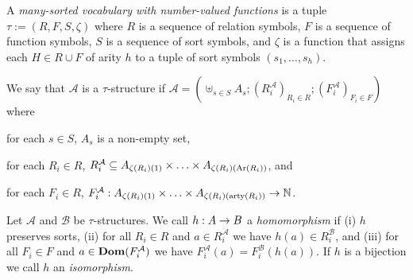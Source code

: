 \documentclass[../main/thesis.tex]{subfiles}
\begin{document}

\begin{definition}
  A \emph{many-sorted vocabulary with number-valued functions} is a tuple $\tau
  := (R, F, S, \zeta)$ where $R$ is a sequence of relation symbols, $F$ is a
  sequence of function symbols, $S$ is a sequence of sort symbols, and $\zeta$
  is a function that assigns each $H \in R \cup F$ of arity $h$ to a tuple of
  sort symbols $(s_1, \ldots, s_h)$.

  We say that $\mathcal{A}$ is a $\tau$-structure if $\mathcal{A} = (\uplus_{s
    \in S} A_s; (R^{\mathcal{A}}_i)_{R_i \in R} ; (F^{\mathcal{A}}_i)_{F_i \in
    F})$ where
  \begin{myitemize}
  \item for each $s \in S$, $A_s$ is a non-empty set,
  \item for each $R_i \in R$, $R^{\mathcal{A}}_i \subseteq A_{\zeta(R_i)(1)}
    \times \ldots \times A_{\zeta(R_i)(\text{\upshape Ar}(R_i))}$, and
  \item for each $F_i \in R$, $F^{\mathcal{A}}_i : A_{\zeta(R_i)(1)} \times
    \ldots \times A_{\zeta(R_i)(\mathrm{arty}(R_i))} \rightarrow \mathbb{N}$.
  \end{myitemize}

  Let $\mathcal{A}$ and $\mathcal{B}$ be $\tau$-structures. We call $h : A \rightarrow
  B$ a \emph{homomorphism} if (i) $h$ preserves sorts, (ii) for all $R_i \in R$
  and $a \in R^{\mathcal{A}}_i$ we have $h(a) \in R^{\mathcal{B}}_i$, and (iii)
  for all $F_i \in F$ and $a \in \text{\textbf{Dom}} (F^{\mathcal{A}}_i)$ we have
  $F^{\mathcal{A}}_i(a) = F^{\mathcal{B}}_i(h(a))$. If $h$ is a bijection we
  call $h$ an \emph{isomorphism}.
\end{definition}
\end{document}

